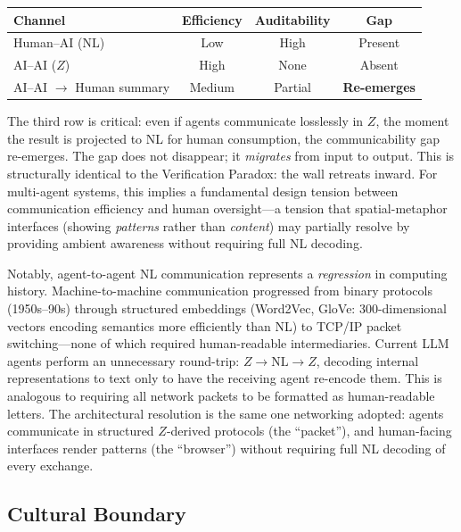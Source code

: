 \documentclass[11pt]{article}
\theoremstyle{definition}
\begin{document}
\begin{center}
\footnotesize
\begin{tabular}{@{}lccc@{}}
\toprule
\textbf{Channel} & \textbf{Efficiency} & \textbf{Auditability} & \textbf{Gap} \\
\midrule
Human--AI (NL) & Low & High & Present \\
AI--AI ($Z$) & High & None & Absent \\
AI--AI $\to$ Human summary & Medium & Partial & \textbf{Re-emerges} \\
\bottomrule
\end{tabular}
\end{center}

The third row is critical: even if agents communicate losslessly in $Z$, the moment the result is projected to NL for human consumption, the communicability gap re-emerges. The gap does not disappear; it \emph{migrates} from input to output. This is structurally identical to the Verification Paradox: the wall retreats inward. For multi-agent systems, this implies a fundamental design tension between communication efficiency and human oversight---a tension that spatial-metaphor interfaces (showing \emph{patterns} rather than \emph{content}) may partially resolve by providing ambient awareness without requiring full NL decoding.

Notably, agent-to-agent NL communication represents a \emph{regression} in computing history. Machine-to-machine communication progressed from binary protocols (1950s--90s) through structured embeddings (Word2Vec, GloVe: 300-dimensional vectors encoding semantics more efficiently than NL) to TCP/IP packet switching---none of which required human-readable intermediaries. Current LLM agents perform an unnecessary round-trip: $Z \to \text{NL} \to Z$, decoding internal representations to text only to have the receiving agent re-encode them. This is analogous to requiring all network packets to be formatted as human-readable letters. The architectural resolution is the same one networking adopted: agents communicate in structured $Z$-derived protocols (the ``packet''), and human-facing interfaces render patterns (the ``browser'') without requiring full NL decoding of every exchange.

\subsection{Cultural Boundary}
\end{document}
